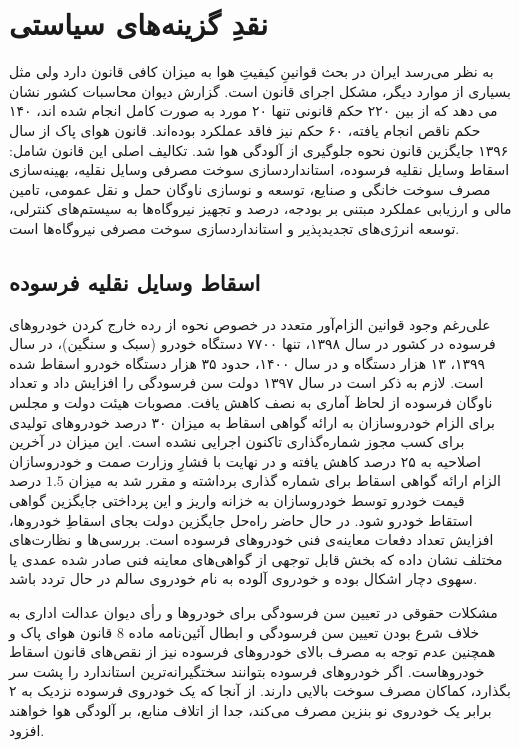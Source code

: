\documentclass[12pt]{atu}
\begin{document}
\section{نقدِ گزینه‌های سیاستی}
به نظر می‌رسد ایران در بحث قوانینِ کیفیتِ هوا به میزان کافی قانون دارد ولی مثل بسیاری از موارد دیگر، مشکل اجرای قانون است. گزارش دیوان محاسبات کشور نشان می دهد که از بین ۲۲۰ حکم قانونی تنها ۲۰ مورد به صورت کامل انجام شده اند، ۱۴۰ حکم ناقص انجام یافته، ۶۰ حکم نیز فاقد عملکرد بوده‌اند. 
\cite{divan1400}
قانون هوای پاک از سال ۱۳۹۶ جایگزین قانون نحوه جلوگیری از آلودگی هوا شد. تکالیف اصلی این قانون شامل: اسقاط وسایل نقلیه فرسوده، استانداردسازی سوخت مصرفی وسایل نقلیه، بهینه‌سازی مصرف سوخت خانگی و صنایع، توسعه و نوسازی ناوگان حمل و نقل عمومی، تامین مالی و ارزیابی عملکرد مبتنی بر بودجه، درصد و تجهیز نیروگاه‌ها به سیستم‌های کنترلی، توسعه انرژی‌های تجدیدپذیر و استانداردسازی سوخت مصرفی نیروگاه‌ها است. 
\subsection{اسقاط وسایل نقلیه فرسوده}
علی‌رغم وجود قوانین الزام‌آور متعدد در خصوص نحوه از رده خارج کردن خودروهای فرسوده در کشور در سال ۱۳۹۸، تنها ۷۷۰۰ دستگاه خودرو (سبک و سنگین)، در سال ۱۳۹۹، ۱۳ هزار دستگاه و در سال ۱۴۰۰، حدود ۳۵ هزار دستگاه خودرو اسقاط شده است. 
لازم به ذکر است در سال ۱۳۹۷ دولت سن فرسودگی را افزایش داد و تعداد ناوگان فرسوده از لحاظ آماری به نصف کاهش یافت. مصوبات هیئت دولت و مجلس برای الزام خودروسازان به ارائه گواهی اسقاط به میزان ۳۰ درصد خودروهای تولیدی  برای کسب مجوز شماره‌گذاری تاکنون اجرایی نشده است. این میزان در آخرین اصلاحیه به ۲۵ درصد کاهش یافته و در نهایت با فشارِ وزارت صمت و خودروسازان الزام ارائه گواهی اسقاط برای شماره گذاری برداشته و مقرر شد به میزان $1.5$ درصد قیمت خودرو  توسط خودروسازان  به خزانه واریز  و این پرداختی جایگزین گواهی استقاط خودرو شود. در حال حاضر راه‌حل جایگزین دولت بجای اسقاطِ خودروها، افزایش تعداد دفعات معاینه‌ی فنی خودروهای فرسوده است. بررسی‌ها و نظارت‌های مختلف نشان داده که بخش قابل توجهی از گواهی‌های معاینه‌ فنی صادر شده عمدی یا سهوی دچار اشکال بوده و خودروی آلوده به نام خودروی سالم در حال تردد باشد.

مشکلات حقوقی در تعیین سن فرسودگی برای خودروها و  رأی دیوان عدالت اداری به خلاف شرع بودن تعیین سن فرسودگی و ابطال آئین‌نامه ماده 8 قانون هوای پاک و همچنین عدم توجه به مصرف بالای خودروهای فرسوده نیز از نقص‌های قانون اسقاط خودروهاست. اگر خودروهای فرسوده بتوانند سختگیرانه‌ترین استاندارد را  پشت سر بگذارد، کماکان مصرف سوخت بالایی دارند. از آنجا که یک خودروی فرسوده نزدیک به ۲ برابر یک خودروی نو بنزین مصرف می‌کند، جدا از اتلاف منابع، بر آلودگی هوا خواهند افزود.
\end{document}
